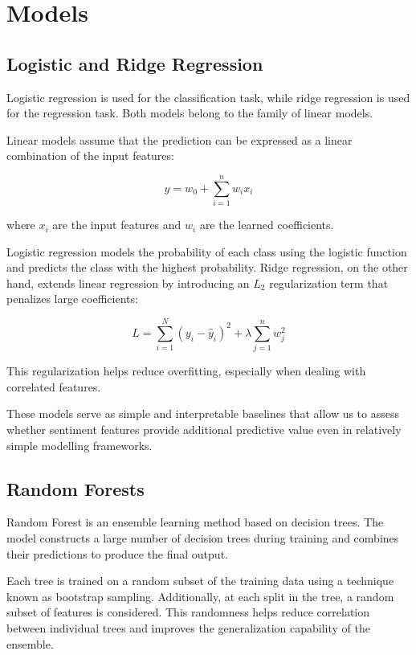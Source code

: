 \chapter{Models}
\label{appendix:models}

\section{Logistic and Ridge Regression}

Logistic regression is used for the classification task, while ridge regression is used for the regression task. Both models belong to the family of linear models.

Linear models assume that the prediction can be expressed as a linear combination of the input features:

\begin{equation}
y = w_0 + \sum_{i=1}^{n} w_i x_i
\end{equation}

where $x_i$ are the input features and $w_i$ are the learned coefficients.

Logistic regression models the probability of each class using the logistic function and predicts the class with the highest probability. Ridge regression, on the other hand, extends linear regression by introducing an $L_2$ regularization term that penalizes large coefficients:

\begin{equation}
L = \sum_{i=1}^{N} (y_i - \hat{y}_i)^2 + \lambda \sum_{j=1}^{n} w_j^2
\end{equation}

This regularization helps reduce overfitting, especially when dealing with correlated features.

These models serve as simple and interpretable baselines that allow us to assess whether sentiment features provide additional predictive value even in relatively simple modelling frameworks.

\section{Random Forests}

Random Forest is an ensemble learning method based on decision trees. The model constructs a large number of decision trees during training and combines their predictions to produce the final output.

Each tree is trained on a random subset of the training data using a technique known as bootstrap sampling. Additionally, at each split in the tree, a random subset of features is considered. This randomness helps reduce correlation between individual trees and improves the generalization capability of the ensemble.


